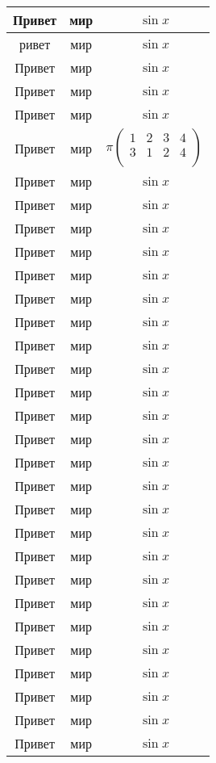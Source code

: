 \documentclass[a4paper,12pt, landscape]{report}
\begin{document}
\begin{center}
\begin{longtable}{|c||c||c|}
\hline
Привет & мир & $\sin x$ \\
\hline
ривет & мир & $\sin x$ \\
\hline
\hline
Привет & мир & $\sin x$ \\
\hline
Привет & мир & $\sin x$ \\
Привет & мир & $\sin x$ \\
\hline
Привет & мир & $ \pi \left(
\begin{array}{cccc}
1 & 2 & 3 & 4\\
3 & 1 & 2 & 4\\
\end{array}
\right)
$
 \\
\hline
Привет & мир & $\sin x$ \\
\hline
Привет & мир & $\sin x$ \\
\hline
Привет & мир & $\sin x$ \\
\hline
Привет & мир & $\sin x$ \\
\hline
Привет & мир & $\sin x$ \\
\hline
Привет & мир & $\sin x$ \\
\hline
Привет & мир & $\sin x$ \\
\hline
Привет & мир & $\sin x$ \\
\hline
Привет & мир & $\sin x$ \\
\hline
Привет & мир & $\sin x$ \\
\hline
Привет & мир & $\sin x$ \\
\hline
Привет & мир & $\sin x$ \\
\hline
Привет & мир & $\sin x$ \\
\hline
Привет & мир & $\sin x$ \\
\hline
Привет & мир & $\sin x$ \\
\hline
Привет & мир & $\sin x$ \\
\hline
Привет & мир & $\sin x$ \\
\hline
Привет & мир & $\sin x$ \\
\hline
Привет & мир & $\sin x$ \\
\hline
Привет & мир & $\sin x$ \\
\hline
Привет & мир & $\sin x$ \\
\hline
Привет & мир & $\sin x$ \\
\hline
Привет & мир & $\sin x$ \\
\hline
Привет & мир & $\sin x$ \\
\hline
Привет & мир & $\sin x$ \\

\end{longtable}
\end{center}
\end{document}
